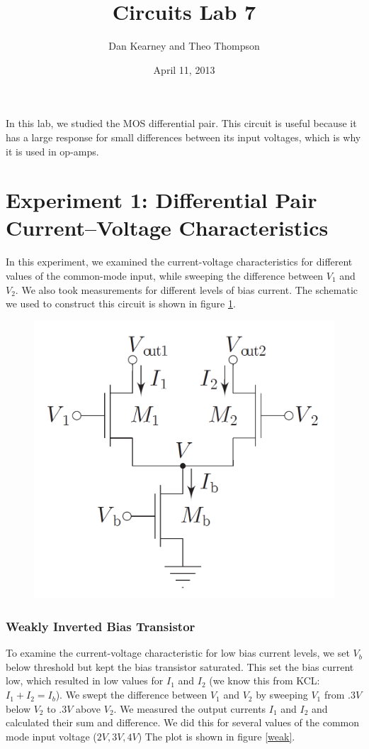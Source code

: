 \documentclass{article}
\title{Circuits Lab 7}
\author{Dan Kearney and Theo Thompson}
\date{April 11, 2013}
\begin{document}
\maketitle
In this lab, we studied the MOS differential pair. This circuit is useful because it has a large response for small differences between its input voltages, which is why it is used in op-amps.
\section*{Experiment 1: Differential Pair Current–Voltage Characteristics}
In this experiment, we examined the current-voltage characteristics for different values of the common-mode input, while sweeping the difference between $V_1$ and $V_2$. We also took measurements for different levels of bias current. The schematic we used to construct this circuit is shown in figure \ref{schem}. 
\begin{figure}[H]
\centering
\includegraphics[scale=.4]{diffSchem.png}
\label{schem}
\caption{}
\end{figure}

\subsubsection*{Weakly Inverted Bias Transistor}
To examine the current-voltage characteristic for low bias current levels, we set $V_b$ below threshold but kept the bias transistor saturated. This set the bias current low, which resulted in low values for $I_1$ and $I_2$ (we know this from KCL: $I_1+I_2=I_b$). We swept the difference between $V_1$ and $V_2$ by sweeping $V_1$ from $.3V$ below $V_2$ to $.3V$ above $V_2$. We measured the output currents $I_1$ and $I_2$ and calculated their sum and difference. We did this for several values of the common mode input voltage ($2V,3V,4V$) The plot is shown in figure \ref{weak}.\\
\end{document}
